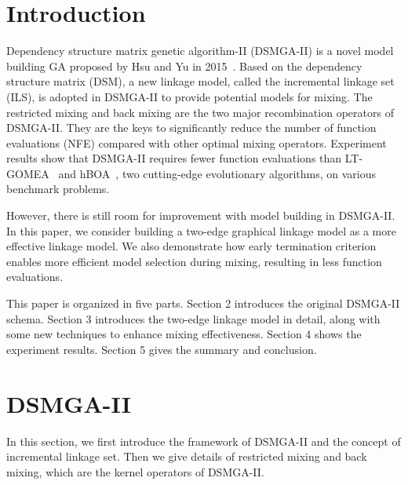\documentclass{sig-alternate-05-2015}
\begin{document}
%
%

%
%
\printccsdesc


\section{Introduction}

Dependency structure matrix genetic algorithm-II (DSMGA-II) is a novel model building GA proposed by Hsu and Yu in 2015~\cite{hsu:DSMGA2}.
Based on the dependency structure matrix (DSM), a new linkage model, called the incremental linkage set (ILS), is adopted in DSMGA-II to provide potential models for mixing. The restricted mixing and back mixing are the two major recombination operators of DSMGA-II. They are the keys to significantly reduce the number of function evaluations (NFE) compared with other optimal mixing operators. Experiment results show that DSMGA-II requires fewer function evaluations  than  LT-GOMEA~\cite{bosman:LT-GOMEA} and hBOA~\cite{pelikan:hBOA}, two cutting-edge evolutionary algorithms, on various benchmark problems. 

However, there is still room for improvement with model building in DSMGA-II. In this paper, we consider building a two-edge graphical linkage model as a more effective linkage model. We also demonstrate how early termination criterion enables more efficient model selection during mixing, resulting in less function evaluations.


This paper is organized in five parts. Section 2 introduces the original DSMGA-II schema. Section 3 introduces the two-edge linkage model in detail, along with some new techniques to enhance mixing effectiveness. Section 4 shows the experiment results. Section 5 gives the summary and conclusion.



\section{DSMGA-II}
In this section, we first introduce the framework of DSMGA-II and the concept of incremental linkage set. Then we give details of restricted mixing and back mixing, which are the kernel operators of DSMGA-II.
\end{document}

